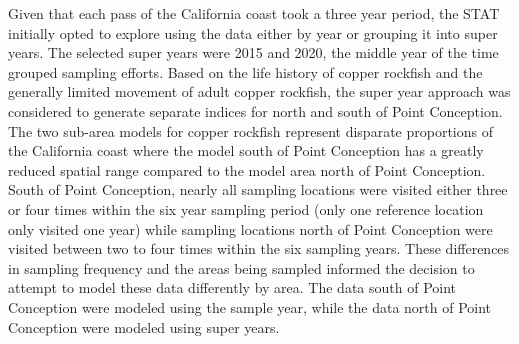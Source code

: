\documentclass[11pt,
  english,
  letterpaper,
]{article}
\begin{document}
Given that each pass of the California coast took a three year period, the STAT initially opted to explore using the data either by year or grouping it into super years. The selected super years were 2015 and 2020, the middle year of the time grouped sampling efforts. Based on the life history of copper rockfish and the generally limited movement of adult copper rockfish, the super year approach was considered to generate separate indices for north and south of Point Conception. The two sub-area models for copper rockfish represent disparate proportions of the California coast where the model south of Point Conception has a greatly reduced spatial range compared to the model area north of Point Conception. South of Point Conception, nearly all sampling locations were visited either three or four times within the six year sampling period (only one reference location only visited one year) while sampling locations north of Point Conception were visited between two to four times within the six sampling years. These differences in sampling frequency and the areas being sampled informed the decision to attempt to model these data differently by area. The data south of Point Conception were modeled using the sample year, while the data north of Point Conception were modeled using super years.
\end{document}
